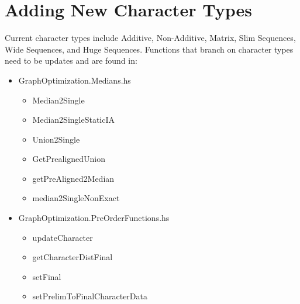 \documentclass[11pt]{article}
\begin{document}
	\section{Adding New Character Types}
		Current character types include Additive, Non-Additive, Matrix, Slim Sequences, Wide Sequences, and Huge Sequences.  
		Functions that branch on character types need to be updates and are found in:
		\begin{itemize}
			 \item{GraphOptimization.Medians.hs}
			 	\begin{itemize}
			 		\item{Median2Single}
					\item{Median2SingleStaticIA}
					\item{Union2Single}
					\item{GetPrealignedUnion}
					\item{getPreAligned2Median}
					\item{median2SingleNonExact}
			 	\end{itemize}
			 \item{GraphOptimization.PreOrderFunctions.hs}
			 	\begin{itemize}
			 		\item{updateCharacter}
			 		\item{getCharacterDistFinal}
			 		\item{setFinal}
			 		\item{setPrelimToFinalCharacterData}
			 	\end{itemize}
		 

\end{itemize}
\end{document}
